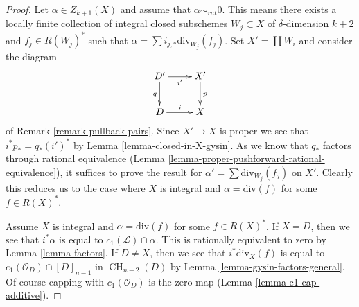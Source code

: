\documentclass[10pt,a4paper]{amsart}
\theoremstyle{plain}
\theoremstyle{definition}
\theoremstyle{remark}
\numberwithin{equation}{subsection}
\def\CH{\mathop{\mathrm{CH}}\nolimits}
\begin{document}
\begin{proof}
Let $\alpha \in Z_{k + 1}(X)$ and assume that $\alpha \sim_{rat} 0$.
This means there exists a locally finite collection of integral
closed subschemes $W_j \subset X$ of $\delta$-dimension $k + 2$
and $f_j \in R(W_j)^*$ such that
$\alpha = \sum i_{j, *}\text{div}_{W_j}(f_j)$.
Set $X' = \coprod W_i$ and consider the diagram
$$
\xymatrix{
D' \ar[d]_q \ar[r]_{i'} & X' \ar[d]^p \\
D \ar[r]^i & X
}
$$
of Remark \ref{remark-pullback-pairs}. Since $X' \to X$ is proper
we see that $i^*p_* = q_*(i')^*$ by Lemma \ref{lemma-closed-in-X-gysin}.
As we know that $q_*$ factors through rational equivalence
(Lemma \ref{lemma-proper-pushforward-rational-equivalence}), it suffices
to prove the result for $\alpha' = \sum \text{div}_{W_j}(f_j)$
on $X'$. Clearly this reduces us to the case where $X$ is integral
and $\alpha = \text{div}(f)$ for some $f \in R(X)^*$.

\medskip\noindent
Assume $X$ is integral and $\alpha = \text{div}(f)$ for some $f \in R(X)^*$.
If $X = D$, then we see that $i^*\alpha$ is equal
to $c_1(\mathcal{L}) \cap \alpha$.
This is rationally equivalent to zero by Lemma \ref{lemma-factors}.
If $D \not = X$, then we see that $i^*\text{div}_X(f)$ is equal to
$c_1(\mathcal{O}_D) \cap [D]_{n - 1}$ in $\CH_{n - 2}(D)$ by
Lemma \ref{lemma-gysin-factors-general}. Of course
capping with $c_1(\mathcal{O}_D)$ is the zero map
(Lemma \ref{lemma-c1-cap-additive}).
\end{proof}
\end{document}
